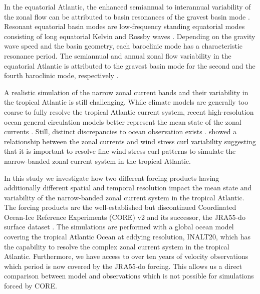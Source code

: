 \documentclass[os, manuscript]{copernicus}
\begin{document}
In the equatorial Atlantic, the enhanced semiannual to interannual variability of the zonal flow can be attributed to basin resonances of the gravest basin mode \citep{Thierry2004,Ascani2006,Orgeville2007,Ding2009,Greatbatch2012,Claus2016a,Brandt2016}. Resonant equatorial basin modes are low-frequency standing equatorial modes consisting of long equatorial Kelvin and Rossby waves \citep{Cane1981}. Depending on the gravity wave speed and the basin geometry, each baroclinic mode has a characteristic resonance period. The semiannual and annual zonal flow variability in the equatorial Atlantic is attributed to the gravest basin mode for the second and the fourth baroclinic mode, respectively \citep{Brandt2016}.


A realistic simulation of the narrow zonal current bands and their variability in the tropical Atlantic is still challenging. While climate models are generally too coarse to fully resolve the tropical Atlantic current system, recent high-resolution ocean general circulation models better represent the mean state of the zonal currents \citep{Duteil2014a}. Still, distinct discrepancies to ocean observation exists \citep{Burmeister2020,Burmeister2019}. \cite{Burmeister2020} showed a relationship between the zonal currents and wind stress curl variability suggesting that it is important to resolve fine wind stress curl patterns to simulate the narrow-banded zonal current system in the tropical Atlantic. 

In this study we investigate how two different forcing products having additionally different spatial and temporal resolution impact the mean state and variability of the narrow-banded zonal current system in the tropical Atlantic. The forcing products are the well-established but discontinued Coordinated Ocean-Ice Reference Experiments (CORE) v2 \citep{Large2009} and its successor, the JRA55-do surface dataset \citep{Tsujino2018}. The simulations are performed with a global ocean model covering the tropical Atlantic Ocean at eddying resolution, INALT20, which has the capability to resolve the complex zonal current system in the tropical Atlantic. Furthermore, we have access to over ten years of velocity observations which period is now covered by the JRA55-do forcing. This allows us a direct comparison between model and observations which is not possible for simulations forced by CORE.
\end{document}
